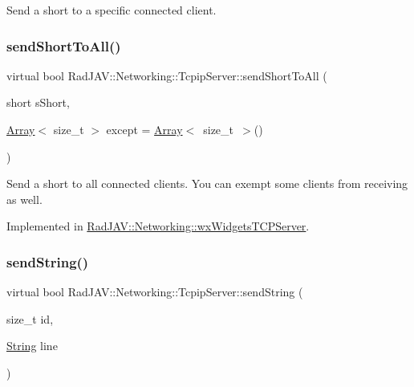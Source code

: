 Send a short to a specific connected client. \mbox{\label{class_rad_j_a_v_1_1_networking_1_1_tcpip_server_a01f6b4d1a26490f540bdf1c070b0e2e0}} 
\subsubsection{\texorpdfstring{send\+Short\+To\+All()}{sendShortToAll()}}
{\footnotesize\ttfamily virtual bool Rad\+J\+A\+V\+::\+Networking\+::\+Tcpip\+Server\+::send\+Short\+To\+All (\begin{DoxyParamCaption}\item[{short}]{s\+Short,  }\item[{\mbox{\hyperlink{class_rad_j_a_v_1_1_array}{Array}}$<$ size\+\_\+t $>$}]{except = {\ttfamily \mbox{\hyperlink{class_rad_j_a_v_1_1_array}{Array}}$<$~size\+\_\+t~$>$()} }\end{DoxyParamCaption})\hspace{0.3cm}{\ttfamily [pure virtual]}}

Send a short to all connected clients. You can exempt some clients from receiving as well. 

Implemented in \mbox{\hyperlink{class_rad_j_a_v_1_1_networking_1_1wx_widgets_t_c_p_server_a501d55c3cf45c675ddb8b627c5066812}{Rad\+J\+A\+V\+::\+Networking\+::wx\+Widgets\+T\+C\+P\+Server}}.

\mbox{\label{class_rad_j_a_v_1_1_networking_1_1_tcpip_server_a96df6c32b4f3db9900c84224d1fabd5b}} 
\subsubsection{\texorpdfstring{send\+String()}{sendString()}}
{\footnotesize\ttfamily virtual bool Rad\+J\+A\+V\+::\+Networking\+::\+Tcpip\+Server\+::send\+String (\begin{DoxyParamCaption}\item[{size\+\_\+t}]{id,  }\item[{\mbox{\hyperlink{class_rad_j_a_v_1_1_string}{String}}}]{line }\end{DoxyParamCaption})\hspace{0.3cm}{\ttfamily [pure virtual]}}

